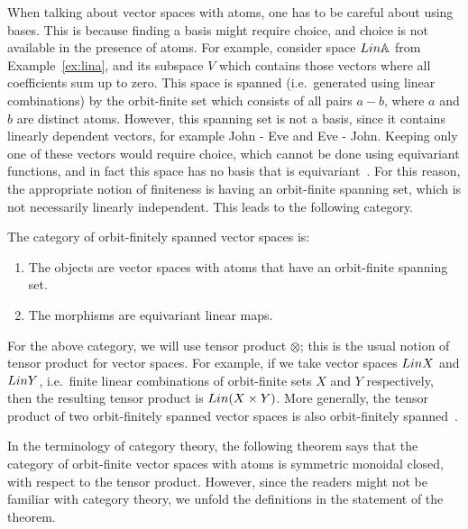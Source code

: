 When talking about vector spaces with atoms, one has to be careful about using bases. This is because finding a basis might require choice, and choice is not available in the presence of atoms. 
For example, consider space $\Lin \atoms$ from Example~\ref{ex:lina}, and its subspace $V$ which contains those vectors where all coefficients sum up to zero. This space is spanned (i.e.~generated using linear combinations) by the orbit-finite set which consists of all pairs $a - b$, where $a$ and $b$ are distinct atoms.
However, this spanning set is not a basis, since it contains linearly dependent vectors, for example John - Eve and Eve - John. Keeping only one of these vectors would require choice, which cannot be done using equivariant functions, and in fact this space has no basis that is equivariant~\cite[Example 6]{bojanczykKM21OrbitFiniteVector}. For this reason, the appropriate notion of finiteness is having an orbit-finite spanning set, which is not necessarily linearly independent. This leads to the following category.

\begin{definition}\label{def:orbit-finite-vector-space-category}
    The category of orbit-finitely spanned vector spaces is:
    \begin{enumerate}
        \item The objects are vector spaces with atoms that have an orbit-finite spanning set.
        \item The morphisms are equivariant linear maps.
    \end{enumerate}
\end{definition}

For the above category, we will use tensor product $\otimes$; this is the usual notion of tensor product for vector spaces. For example, if we take vector spaces $\Lin X$ and $\Lin Y$, i.e.~finite linear combinations of orbit-finite sets $X$ and $Y$ respectively, then the resulting tensor product is $\Lin (X \times Y)$. More generally, the tensor product of two orbit-finitely spanned vector spaces is also orbit-finitely spanned~\cite[Theorem VI.3]{bojanczykKM21OrbitFiniteVector}. 

In the terminology of category theory, the following theorem says that the category of orbit-finite vector spaces with atoms is symmetric monoidal closed, with respect to the tensor product. However, since the readers might not be familiar with category theory, we unfold the definitions in the statement of the theorem. 


